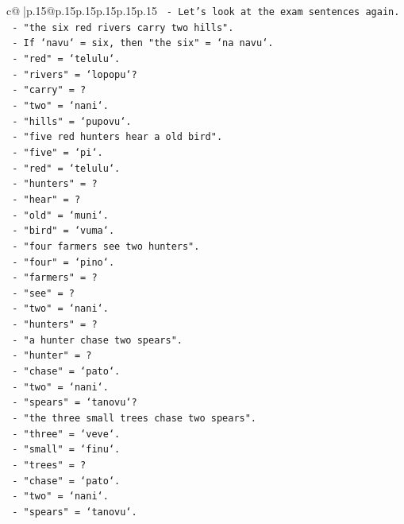 \documentclass{article}
\begin{document}
{\begin{supertabular}{c@{$\;$}|p{.15\linewidth}@{}p{.15\linewidth}p{.15\linewidth}p{.15\linewidth}p{.15\linewidth}p{.15\linewidth}}
{{{\texttt{    {-} Let's look at the exam sentences again.} \\
\texttt{    {-} "the six red rivers carry two hills".} \\
\texttt{    {-} If `navu` = six, then "the six" = `na navu`.} \\
\texttt{    {-} "red" = `telulu`.} \\
\texttt{    {-} "rivers" = `lopopu`?} \\
\texttt{    {-} "carry" = ?} \\
\texttt{    {-} "two" = `nani`.} \\
\texttt{    {-} "hills" = `pupovu`.} \\
\texttt{  {-} "five red hunters hear a old bird".} \\
\texttt{    {-} "five" = `pi`.} \\
\texttt{    {-} "red" = `telulu`.} \\
\texttt{    {-} "hunters" = ?} \\
\texttt{    {-} "hear" = ?} \\
\texttt{    {-} "old" = `muni`.} \\
\texttt{    {-} "bird" = `vuma`.} \\
\texttt{  {-} "four farmers see two hunters".} \\
\texttt{    {-} "four" = `pino`.} \\
\texttt{    {-} "farmers" = ?} \\
\texttt{    {-} "see" = ?} \\
\texttt{    {-} "two" = `nani`.} \\
\texttt{    {-} "hunters" = ?} \\
\texttt{  {-} "a hunter chase two spears".} \\
\texttt{    {-} "hunter" = ?} \\
\texttt{    {-} "chase" = `pato`.} \\
\texttt{    {-} "two" = `nani`.} \\
\texttt{    {-} "spears" = `tanovu`?} \\
\texttt{  {-} "the three small trees chase two spears".} \\
\texttt{    {-} "three" = `veve`.} \\
\texttt{    {-} "small" = `finu`.} \\
\texttt{    {-} "trees" = ?} \\
\texttt{    {-} "chase" = `pato`.} \\
\texttt{    {-} "two" = `nani`.} \\
\texttt{    {-} "spears" = `tanovu`.} \\
}}}
\end{supertabular}}
\end{document}
